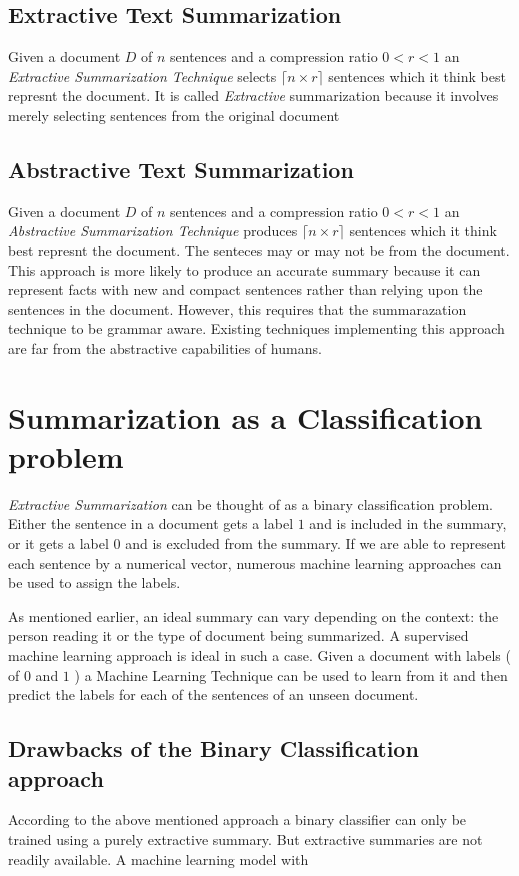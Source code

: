 \documentclass[paper=a4, fontsize=11pt]{scrartcl} %
\numberwithin{equation}{section} %
\numberwithin{figure}{section} %
\numberwithin{table}{section} %
\begin{document}
\subsection{Extractive Text Summarization}
Given a document $D$ of $n$ sentences and a compression ratio $ 0 < r < 1 $ an \emph{Extractive Summarization Technique} selects $\lceil n \times r \rceil $  sentences which it think best represnt the document. It is called \emph{Extractive} summarization because it involves merely selecting sentences from the original document

\subsection{Abstractive Text Summarization}
Given a document $D$ of $n$ sentences and a compression ratio $ 0 < r < 1 $ an \emph{Abstractive Summarization Technique} produces $\lceil n \times r \rceil $  sentences which it think best represnt the document. The senteces may or may not be from the document. This approach is more likely to produce an accurate summary because it can represent facts with new and compact sentences rather than relying upon the sentences in the document. However, this requires that the summarazation technique to be grammar aware. Existing techniques implementing this approach are far from the abstractive capabilities of humans.


\section{Summarization as a Classification problem}
\emph{Extractive Summarization} can be thought of as a binary classification problem. Either the sentence in a document gets a label $1$ and is included in the summary, or it gets a label $0$ and is excluded from the summary. If we are able to represent each sentence by a numerical vector, numerous machine learning approaches can be used to assign the labels.
\\
\par
As mentioned earlier, an ideal summary can vary depending on the context: the person reading it or the type of document being summarized. A supervised machine learning approach is ideal in such a case. Given a document with labels ( of $0$ and $1$ ) a Machine Learning Technique can be used to learn from it and then predict the labels for each of the sentences of an unseen document. 

\subsection{Drawbacks of the Binary Classification approach}
According to the above mentioned approach a binary classifier can only be trained using a purely extractive summary. But extractive summaries are not readily available. A machine learning model with 

{}

\end{document}
